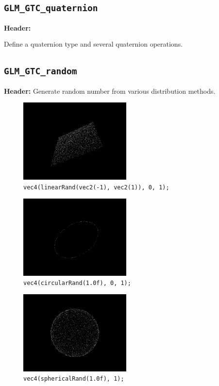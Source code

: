 \documentclass{scrartcl}
\numberwithin{figure}{subsection}
\begin{document}
\subsection{\texttt{GLM\_GTC\_quaternion}}
\textbf{Header:} 

Define a quaternion type and several quaternion operations.

\subsection{\texttt{GLM\_GTC\_random}}
\textbf{Header:} 
Generate random number from various distribution methods.

\begin{figure}[h]
  \centering
  \includegraphics[width=0.5\textwidth]{linearrand}
  \cprotect\caption{\verb|vec4(linearRand(vec2(-1), vec2(1)), 0, 1);|}
\end{figure}

\begin{figure}[h]
  \centering
  \includegraphics[width=0.5\textwidth]{circularrand}
  \cprotect\caption{\verb|vec4(circularRand(1.0f), 0, 1);|}
\end{figure}

\begin{figure}[h]
  \centering
  \includegraphics[width=0.5\textwidth]{sphericalrand}
  \cprotect\caption{\verb|vec4(sphericalRand(1.0f), 1);|}
\end{figure}
\end{document}
